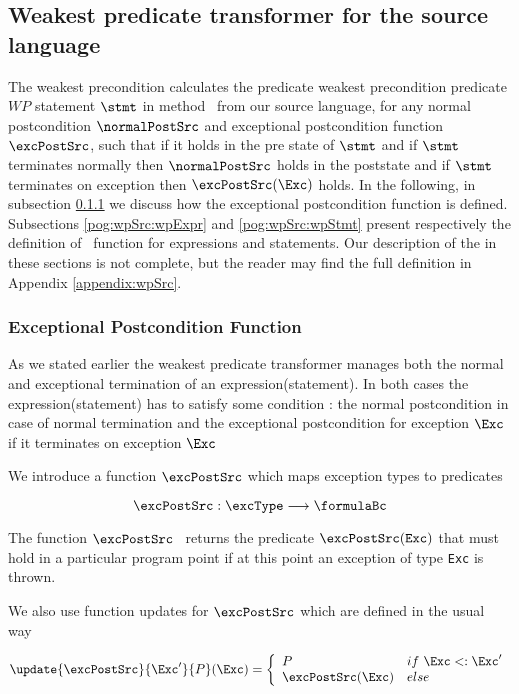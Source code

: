 


\subsection{Weakest predicate transformer for the source language } \label{pog:wpSrc}

The weakest precondition calculates  the predicate weakest precondition predicate $WP$  statement $\stmt$ in method \methodd \ from our source language,
for any normal postcondition $\normalPostSrc$ and exceptional postcondition function $\excPostSrc$, 
 such that if it holds in the pre state of $\stmt$ and   if $\stmt$ terminates normally then $\normalPostSrc$  holds in the poststate and
 if $\stmt$ terminates on exception \Exc{} then $\excPostSrc(\Exc)$ holds. 
In the following, in  subsection   \ref{pog:wpSrc:excPost} we discuss how the exceptional postcondition function is defined.
Subsections \ref{pog:wpSrc:wpExpr} and  \ref{pog:wpSrc:wpStmt} present respectively
 the definition of \wpName \  function for expressions and statements.  Our description of the \wpName{} in these sections is not complete,
but the reader may find the full definition in Appendix \ref{appendix:wpSrc}. 
 



\subsubsection{Exceptional Postcondition Function}\label{pog:wpSrc:excPost}

As we stated earlier the weakest predicate transformer manages both the normal and
 exceptional termination of  an expression(statement). 
In both cases the expression(statement) has to satisfy some condition : 
the normal postcondition in case of normal termination and the exceptional postcondition
for exception $\Exc$ if it terminates on exception $\Exc$


We introduce a function $\excPostSrc$  which maps exception types to predicates  

$$ \excPostSrc :  \excType \longrightarrow   \formulaBc $$ 



The function $\excPostSrc$ \ returns the predicate $\excPostSrc (\mbox{\rm\texttt{Exc}}) $ that must hold in a particular program point if
 at this point an exception of type \mbox{\rm\texttt{Exc}} is thrown.





We also use  function updates for $\excPostSrc$ which are defined in the usual way


$$
\update{\excPostSrc}{\Exc'}{ P }( \Exc )  = 
       \left\{\begin{array}{ll} 
         P & if \ \Exc  <: \Exc'  \\
         \excPostSrc(\Exc ) & else 
     \end{array}\right.$$



